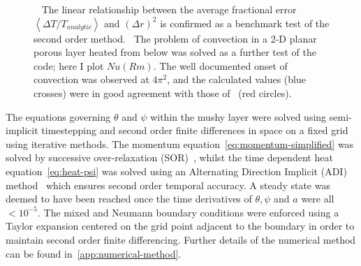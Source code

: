 \documentclass[11pt,twocolumn]{article}
\begin{document}
\begin{figure}[t!]
\captionsetup[subfigure]{position=top,singlelinecheck=off,justification=raggedright, aboveskip=-12pt,belowskip=0pt}
\begin{subfigure}[t]{.48\linewidth}
	\centering
	\caption{}
	\newlength\figureheight 
	\newlength\figurewidth 
	\setlength\figureheight{4cm} 
	\setlength\figurewidth{6cm}
	
	\label{subfig:heated-wire-error}
\end{subfigure}
\quad
\captionsetup[subfigure]{aboveskip=-6pt}
\begin{subfigure}[t]{.48\linewidth}
	\centering
	\caption{} 
	\setlength\figureheight{4cm} 
	\setlength\figurewidth{6cm}
	
	\label{subfig:HRL-Nu-comparison}
\end{subfigure}

\setlength{\belowcaptionskip}{-7pt} %

\caption{~ The linear relationship between the average fractional error $\left<\Delta T/T_{analytic} \right>$ and $(\Delta r)^2$ is confirmed as a benchmark test of the second order method.~ The problem of convection in a 2-D planar porous layer heated from below was solved as a further test of the code; here I plot $Nu(Rm)$. The well documented onset of convection was observed at $4 \pi^2$, and the calculated values (blue crosses) were in good agreement with those of~\citet*{caltagirone-75} (red circles).}
\label{fig:code-verification}
\end{figure}

The equations governing $\theta$ and $\psi$ within the mushy layer were solved using semi-implicit timestepping and second order finite differences in space on a fixed grid using iterative methods. The momentum equation~\eqref{eq:momentum-simplified} was solved by successive over-relaxation (SOR)~\citep*{young-50}, whilst the time dependent heat equation~\eqref{eq:heat-psi} was solved using an Alternating Direction Implicit (ADI) method~\citep*{peaceman-rachford-55} which ensures second order temporal accuracy. A steady state was deemed to have been reached once the time derivatives of $\theta, \psi$ and $a$ were all $< 10^{-5}$. The mixed and Neumann boundary conditions were enforced using a Taylor expansion centered on the grid point adjacent to the boundary in order to maintain second order finite differencing. Further details of the numerical method can be found in~\autoref{app:numerical-method}.
\end{document}
